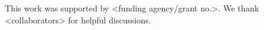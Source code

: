 \ifanonymous\else
\begin{acknowledgements}
This work was supported by <funding agency/grant no.>. We thank <collaborators> for helpful discussions.
\end{acknowledgements}
\fi
